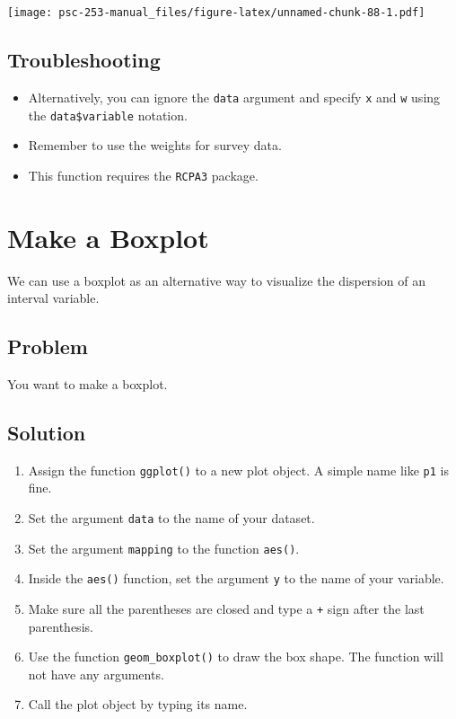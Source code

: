 \documentclass[
]{book}
\providecommand{\tightlist}{%
  \setlength{\itemsep}{0pt}\setlength{\parskip}{0pt}}
\begin{document}
\texttt{[image: psc-253-manual\_files/figure-latex/unnamed-chunk-88-1.pdf]}

\hypertarget{troubleshooting-34}{%
\subsection{Troubleshooting}\label{troubleshooting-34}}

\begin{itemize}
\item
  Alternatively, you can ignore the \texttt{data} argument and specify \texttt{x} and \texttt{w} using the \texttt{data\$variable} notation.
\item
  Remember to use the weights for survey data.
\item
  This function requires the \texttt{RCPA3} package.
\end{itemize}

\hypertarget{boxplot}{%
\section{Make a Boxplot}\label{boxplot}}

We can use a boxplot as an alternative way to visualize the dispersion of an interval variable.

\hypertarget{problem-39}{%
\subsection{Problem}\label{problem-39}}

You want to make a boxplot.

\hypertarget{solution-38}{%
\subsection{Solution}\label{solution-38}}

\begin{enumerate}
\def\labelenumi{\arabic{enumi}.}
\tightlist
\item
  Assign the function \texttt{ggplot()} to a new plot object. A simple name like \texttt{p1} is fine.
\item
  Set the argument \texttt{data} to the name of your dataset.
\item
  Set the argument \texttt{mapping} to the function \texttt{aes()}.
\item
  Inside the \texttt{aes()} function, set the argument \texttt{y} to the name of your variable.
\item
  Make sure all the parentheses are closed and type a \texttt{+} sign after the last parenthesis.
\item
  Use the function \texttt{geom\_boxplot()} to draw the box shape. The function will not have any arguments.
\item
  Call the plot object by typing its name.
\end{enumerate}
\end{document}
